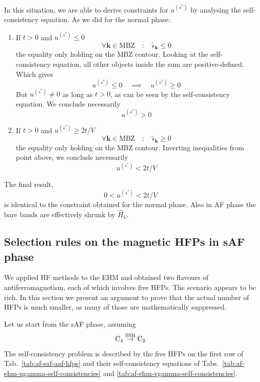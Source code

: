In this situation, we are able to derive constraints for $u^{(s^*)}$ by analysing the self-consistency equation. As we did for the normal phase:
\begin{enumerate}
	\item If $t>0$ and $u^{(s^*)} \le 0$
	\[
	\forall \mathbf{k} \in \mathrm{MBZ}
	\quad\colon\quad
	\tilde{\epsilon}_\mathbf{k} \le 0
	\]
	the equality only holding on the MBZ contour. Looking at the self-consistency equation, all other objects inside the sum are positive-defined. Which gives
	\[
	u^{(s^*)} \le 0
	\quad\implies\quad
	u^{(s^*)} \ge 0
	\]
	But $u^{(s^*)} \neq 0$ as long as $t>0$, as can be seen by the self-consistency equation. We conclude necessarily
	\[
	u^{(s^*)} > 0
	\]
	\item If $t>0$ and $u^{(s^*)} \ge 2t/V$
	\[
	\forall \mathbf{k} \in \mathrm{MBZ}
	\quad\colon\quad
	\tilde{\epsilon}_\mathbf{k} \ge 0
	\]
	the equality only holding on the MBZ contour. Inverting inequalities from point above, we conclude necessarily
	\[
	u^{(s^*)} < 2t/V
	\]
\end{enumerate}
The final result,
\begin{equation}\label{appeq:af-us*-constraint}
	0 < u^{(s^*)} < 2t/V
\end{equation}
is identical to the constraint obtained for the normal phase. Also in AF phase the bare bands are effectively shrunk by $\hat H_V$.

\subsection{Selection rules on the magnetic HFPs in sAF phase}\label{appsubsec:af-HFPs=0-sAF}

We applied HF methods to the EHM and obtained two flavours of antiferromagnetism, each of which involves five HFPs. The scenario appears to be rich. In this section we present an argument to prove that the actual number of HFPs is much smaller, as many of those are mathematically suppressed. 

Let us start from the sAF phase, assuming
\[
	\mathrm{C}_4 \stackrel{\mathrm{SSB}}{\to} \mathrm{C}_2
\]
The self-consistency problem is described by the five HFPs on the first row of Tab.~\ref{tab:af-saf-aaf-hfps} and their self-consistency equations of Tabs.~\ref{tab:af-ehm-ugamma-self-consistencies} and \ref{tab:af-ehm-vgamma-self-consistencies}.

